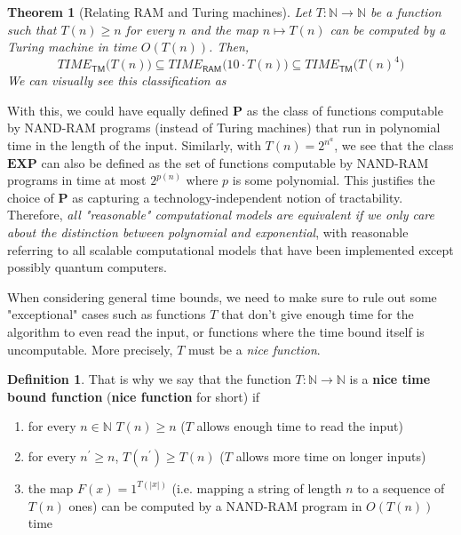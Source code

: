 \documentclass[a4paper, 12pt]{report}
\newtheorem{theorem}{Theorem}[section]
\theoremstyle{remark}
\theoremstyle{definition}
\newtheorem{definition}{Definition}[section]
\begin{document}
\begin{theorem}[Relating RAM and Turing machines]
Let $T: \mathbb{N} \longrightarrow \mathbb{N}$ be a function such that $T(n) \geq n$ for every $n$ and the map $n \mapsto T(n)$ can be computed by a Turing machine in time $O(T(n))$. Then, 
\[TIME_{\mathsf{TM}}\big( T(n)\big) \subseteq TIME_{\mathsf{RAM}}\big( 10 \cdot T(n)\big) \subseteq TIME_{\mathsf{TM}} \big( T(n)^4\big)\]
We can visually see this classification as 
\begin{center}
\end{center}
\end{theorem}

With this, we could have equally defined $\mathbf{P}$ as the class of functions computable by NAND-RAM programs (instead of Turing machines) that run in polynomial time in the length of the input. Similarly, with $T(n) = 2^{n^a}$, we see that the class $\mathbf{EXP}$ can also be defined as the set of functions computable by NAND-RAM programs in time at most $2^{p(n)}$ where $p$ is some polynomial. This justifies the choice of $\mathbf{P}$ as capturing a technology-independent notion of tractability. Therefore, \textit{all "reasonable" computational models are equivalent if we only care about the distinction between polynomial and exponential}, with reasonable referring to all scalable computational models that have been implemented except possibly quantum computers. 

When considering general time bounds, we need to make sure to rule out some "exceptional" cases such as functions $T$ that don't give enough time for the algorithm to even read the input, or functions where the time bound itself is uncomputable. More precisely, $T$ must be a \textit{nice function}. 

\begin{definition}
That is why we say that the function $T: \mathbb{N} \longrightarrow \mathbb{N}$ is a \textbf{nice time bound function} (\textbf{nice function} for short) if 
\begin{enumerate}
    \item for every $n \in \mathbb{N}$ $T(n) \geq n$ ($T$ allows enough time to read the input)
    \item for every $n^\prime \geq n$, $T(n^\prime) \geq T(n)$ ($T$ allows more time on longer inputs)
    \item the map $F(x) = 1^{T(|x|)}$ (i.e. mapping a string of length $n$ to a sequence of $T(n)$ ones) can be computed by a NAND-RAM program in $O(T(n))$ time
\end{enumerate}
\end{definition}
\end{document}

